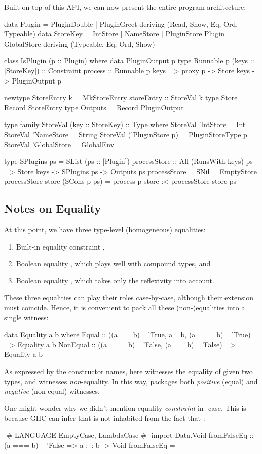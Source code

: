 \documentclass[demotion-paper.tex]{subfiles}
\begin{document}
Built on top of this API, we can now present the entire program architecture:
\begin{code}
data Plugin = PluginDouble | PluginGreet
  deriving (Read, Show, Eq, Ord, Typeable)
data StoreKey
  = IntStore
  | NameStore
  | PluginStore Plugin
  | GlobalStore
  deriving (Typeable, Eq, Ord, Show)

class IsPlugin (p :: Plugin) where
  data PluginOutput p
  type Runnable p (keys :: [StoreKey]) :: Constraint
  process :: Runnable p keys => proxy p -> Store keys -> PluginOutput p

newtype StoreEntry k = MkStoreEntry {storeEntry :: StoreVal k}
type Store = Record StoreEntry
type Outputs = Record PluginOutput

type family StoreVal (key :: StoreKey) :: Type where
  StoreVal 'IntStore = Int
  StoreVal 'NameStore = String
  StoreVal ('PluginStore p) = PluginStoreType p
  StoreVal 'GlobalStore = GlobalEnv

type SPlugins ps = SList (ps :: [Plugin])
processStore :: All (RunsWith keys) ps
             => Store keys -> SPlugins ps -> Outputs ps
processStore _ SNil = EmptyStore
processStore store (SCons p ps) = process p store :< processStore store ps
\end{code}

\subsection{Notes on Equality}
At this point, we have three type-level (homogeneous) equalities:
\begin{enumerate}
\item Built-in equality constraint ,
\item Boolean equality , which plays well with compound types, and
\item Boolean equality , which takes only the reflexivity into account.
\end{enumerate}
These three equalities can play their roles case-by-case, although their extension must coincide.
Hence, it is convenient to pack all these (non-)equalities into a single witness:

\begin{code}
data Equality a b where
  Equal :: ((a == b) ~ 'True, a ~ b, (a === b) ~ 'True) => Equality a b
  NonEqual
    :: ((a === b) ~ 'False, (a == b) ~ 'False) => Equality a b
\end{code}

As expressed by the constructor names, here  witnesses the equality of given two types, and  witnesses \emph{non}-equality.
In this way,  packages both \emph{positive} (equal) and \emph{negative} (non-equal) witnesses.

One might wonder why we didn't mention equality \emph{constraint}  in -case.
This is because GHC can infer that  is not inhabited from the fact that :

\begin{code}
{-# LANGUAGE EmptyCase, LambdaCase #-}
import Data.Void
fromFalseEq :: (a === b) ~ 'False => a :~: b -> Void
fromFalseEq = \case {}
\end{code}
\end{document}
